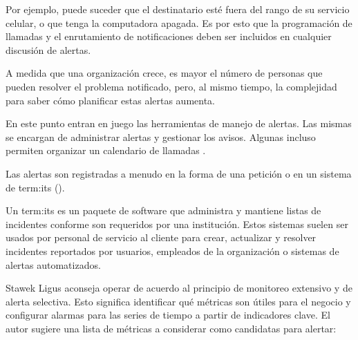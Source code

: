 Por ejemplo, puede suceder que el destinatario esté fuera del rango de su
servicio celular, o que tenga la computadora apagada. Es por esto que la
programación de llamadas y el enrutamiento de notificaciones deben ser
incluidos en cualquier discusión de alertas.

A medida que una organización crece, es mayor el número de personas que pueden
resolver el problema notificado, pero, al mismo tiempo, la complejidad para
saber cómo planificar estas alertas aumenta.

En este punto entran en juego las herramientas de manejo de alertas. Las mismas
se encargan de administrar alertas y gestionar los avisos. Algunas incluso
permiten organizar un calendario de llamadas \cite[p. ~
17]{monitoreo:monitoring_with_grapfite}.

Las alertas son registradas a menudo en la forma de una petición o 
en un sistema de \gls{term:its} ().

Un \gls{term:its} es un paquete de software que administra y mantiene listas de
incidentes conforme son requeridos por una institución. Estos sistemas suelen
ser usados por personal de servicio al cliente para crear, actualizar y
resolver incidentes reportados por usuarios, empleados de la organización o
sistemas de alertas automatizados.

Stawek Ligus aconseja operar de acuerdo al principio de monitoreo extensivo y
de alerta selectiva. Esto significa identificar qué métricas son útiles para el
negocio y configurar alarmas para las series de tiempo a partir de indicadores
clave. El autor sugiere una lista de métricas a considerar como candidatas para
alertar:

